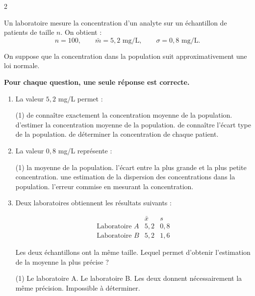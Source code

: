 \documentclass[10pt,a4paper]{article}
\begin{document}
\begin{multicols}{2}
\begin{exo}[QCM][]
Un laboratoire mesure la concentration d'un analyte sur un échantillon de patients de taille \(n\). 
On obtient :
\[
n=100,\qquad \bar{m}=5,2\text{ mg/L},\qquad \sigma=0,8\text{ mg/L}.
\]

On suppose que la concentration dans la population suit approximativement une loi normale.

\textbf{Pour chaque question, une seule réponse est correcte.}

\begin{enumerate}[label=\textbf{\arabic*.}, leftmargin=*]

    \item La valeur \(5,2\) mg/L permet :

    \begin{tasks}(1)
        \task de connaître exactement la concentration moyenne de la population.
        \task d'estimer la concentration moyenne de la population.
        \task de connaître l'écart type de la population.
        \task de déterminer la concentration de chaque patient.
    \end{tasks}

    \item La valeur \(0,8\) mg/L représente :

    \begin{tasks}(1)
        \task la moyenne de la population.
        \task l'écart entre la plus grande et la plus petite concentration.
        \task une estimation de la dispersion des concentrations dans la population.
        \task l'erreur commise en mesurant la concentration.
    \end{tasks}

    \item Deux laboratoires obtiennent les résultats suivants :

    \[
    \begin{array}{c|cc}
        & \bar{x} & s\\
        \hline
        \text{Laboratoire } A & 5,2 & 0,8\\
        \text{Laboratoire } B & 5,2 & 1,6
    \end{array}
    \]

    Les deux échantillons ont la même taille. Lequel permet d'obtenir l'estimation de la moyenne la plus précise ?

    \begin{tasks}(1)
        \task Le laboratoire A.
        \task Le laboratoire B.
        \task Les deux donnent nécessairement la même précision.
        \task Impossible à déterminer.
    \end{tasks}


\end{enumerate}
\end{exo}
\end{multicols}
\end{document}
